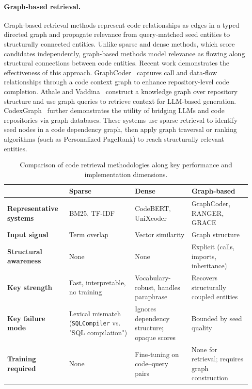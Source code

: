 \paragraph{Graph-based retrieval.}
Graph-based retrieval methods represent code relationships as edges in a typed directed graph and propagate relevance from query-matched seed entities to structurally connected entities. Unlike sparse and dense methods, which score candidates independently, graph-based methods model relevance as flowing along structural connections between code entities. Recent work demonstrates the effectiveness of this approach. GraphCoder~\cite{liu2024graphcoder} captures call and data-flow relationships through a code context graph to enhance repository-level code completion. Athale and Vaddina~\cite{athale2025knowledge} construct a knowledge graph over repository structure and use graph queries to retrieve context for LLM-based generation. CodexGraph~\cite{liu2024codexgraph} further demonstrates the utility of bridging LLMs and code repositories via graph databases. These systems use sparse retrieval to identify seed nodes in a code dependency graph, then apply graph traversal or ranking algorithms (such as Personalized PageRank) to reach structurally relevant entities.

\begin{table}[H]
    \centering
    \small
    \caption{Comparison of code retrieval methodologies along key performance and implementation dimensions.}
    \label{tab:retrieval-comparison}
    \renewcommand{\arraystretch}{1.6}
    \begin{tabularx}{\textwidth}{@{} >{\RaggedRight\bfseries}p{2.4cm} >{\RaggedRight\arraybackslash}X >{\RaggedRight\arraybackslash}X >{\RaggedRight\arraybackslash}X @{}}
        \toprule
        & \textbf{Sparse} & \textbf{Dense} & \textbf{Graph-based} \\
        \midrule
        Representative systems & BM25, TF-IDF & CodeBERT, UniXcoder & GraphCoder, RANGER, GRACE \\
        Input signal & Term overlap & Vector similarity & Graph structure \\
        Structural awareness & None & None & Explicit (calls, imports, inheritance) \\
        Key strength & Fast, interpretable, no training & Vocabulary-robust, handles paraphrase & Recovers structurally coupled entities \\
        Key failure mode & Lexical mismatch (\texttt{SQLCompiler} vs. "SQL compilation") & Ignores dependency structure; opaque scores & Bounded by seed quality \\
        Training required & None & Fine-tuning on code--query pairs & None for retrieval; requires graph construction \\
        \bottomrule
    \end{tabularx}
\end{table}

